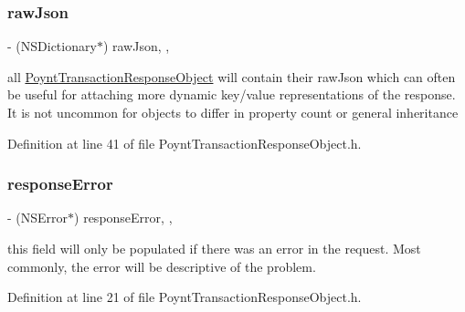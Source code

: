 \hypertarget{interface_poynt_transaction_response_object_a0046f618ca04fd1e7fcf91b87190a944}{}\label{interface_poynt_transaction_response_object_a0046f618ca04fd1e7fcf91b87190a944} 
\subsubsection{\texorpdfstring{raw\+Json}{rawJson}}
{\footnotesize\ttfamily -\/ (N\+S\+Dictionary$\ast$) raw\+Json\hspace{0.3cm}{\ttfamily [read]}, {\ttfamily [nonatomic]}, {\ttfamily [assign]}}

all \hyperlink{interface_poynt_transaction_response_object}{Poynt\+Transaction\+Response\+Object} will contain their {\ttfamily raw\+Json} which can often be useful for attaching more dynamic key/value representations of the response. It is not uncommon for objects to differ in property count or general inheritance 

Definition at line 41 of file Poynt\+Transaction\+Response\+Object.\+h.

\hypertarget{interface_poynt_transaction_response_object_aefb1590b30be0658ebee825cad6bfa83}{}\label{interface_poynt_transaction_response_object_aefb1590b30be0658ebee825cad6bfa83} 
\subsubsection{\texorpdfstring{response\+Error}{responseError}}
{\footnotesize\ttfamily -\/ (N\+S\+Error$\ast$) response\+Error\hspace{0.3cm}{\ttfamily [read]}, {\ttfamily [nonatomic]}, {\ttfamily [assign]}}



this field will only be populated if there was an error in the request. Most commonly, the error will be descriptive of the problem. 



Definition at line 21 of file Poynt\+Transaction\+Response\+Object.\+h.

\hypertarget{interface_poynt_transaction_response_object_ac2acf327011ce6ed9e26a41ceddaee31}{}\label{interface_poynt_transaction_response_object_ac2acf327011ce6ed9e26a41ceddaee31} 
